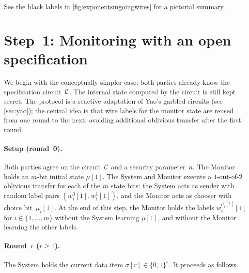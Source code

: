 \noindent See the black labels in \cref{fig:exponentsingoingwires} for a pictorial summary.

\section{Step~1: Monitoring with an open specification}\label{sec:openstep}

We begin with the conceptually simpler case: both parties already know the specification circuit~$\mathcal{C}$. The internal state computed by the circuit is still kept secret. The protocol is a reactive adaptation of Yao's garbled circuits (see \cref{sec:yao}); the central idea is that wire labels for the monitor state are reused from one round to the next, avoiding additional oblivious transfer after the first round.

\paragraph{Setup (round~0).}\label{protocol1}
Both parties agree on the circuit~$\mathcal{C}$ and a security parameter~$n$. The Monitor holds an $m$-bit initial state $\mu[1]$. The System and Monitor execute a $1$-out-of-$2$ oblivious transfer for each of the $m$ state bits: the System acts as sender with random label pairs $(w_i^0[1],w_i^1[1])$, and the Monitor acts as chooser with choice bit~$\mu_i[1]$. At the end of this step, the Monitor holds the labels $w_i^{\mu_i[1]}[1]$ for $i \in \{1,\ldots,m\}$ without the System learning $\mu[1]$, and without the Monitor learning the other labels.

\paragraph{Round~$r$ ($r \geq 1$).}
The System holds the current data item $\sigma[r] \in \{0,1\}^s$. It proceeds as follows.

